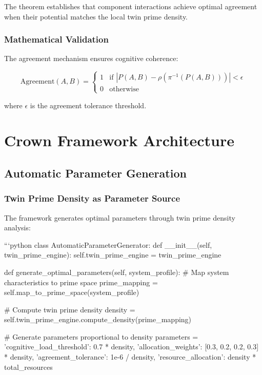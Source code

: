 \documentclass[12pt,a4paper]{article}
\begin{document}
The theorem establishes that component interactions achieve optimal agreement when their potential matches the local twin prime density.

\subsubsection{Mathematical Validation}

The agreement mechanism ensures cognitive coherence:

\[
\text{Agreement}(A,B) = 
\begin{cases} 
1 & \text{if } |P(A,B) - \rho(\pi^{-1}(P(A,B)))| < \epsilon \\
0 & \text{otherwise}
\end{cases}
\]

where $\epsilon$ is the agreement tolerance threshold.

\section{Crown Framework Architecture}

\subsection{Automatic Parameter Generation}

\subsubsection{Twin Prime Density as Parameter Source}

The framework generates optimal parameters through twin prime density analysis:

```python
class AutomaticParameterGenerator:
    def __init__(self, twin_prime_engine):
        self.twin_prime_engine = twin_prime_engine
        
    def generate_optimal_parameters(self, system_profile):
        # Map system characteristics to prime space
        prime_mapping = self.map_to_prime_space(system_profile)
        
        # Compute twin prime density
        density = self.twin_prime_engine.compute_density(prime_mapping)
        
        # Generate parameters proportional to density
        parameters = {
            'cognitive_load_threshold': 0.7 * density,
            'allocation_weights': [0.3, 0.2, 0.2, 0.3] * density,
            'agreement_tolerance': 1e-6 / density,
            'resource_allocation': density * total_resources
        }
        
\end{document}
